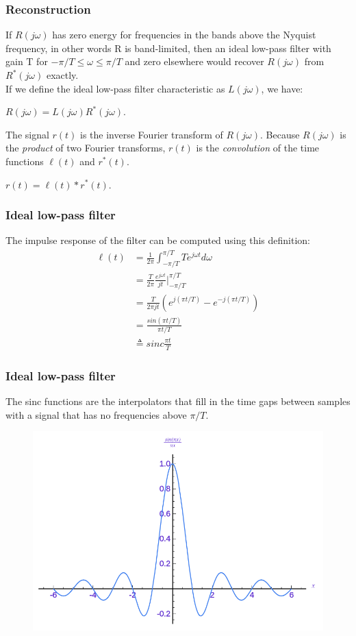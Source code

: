 \begin{frame}
	\frametitle{Reconstruction}
	If $R(j\omega)$ has zero energy for frequencies in the bands above the Nyquist frequency, in other words R is band-limited, then an ideal low-pass filter with gain T for $-\pi/T \leq \omega \leq \pi/T$ and zero elsewhere would recover $R(j\omega)$ from $R^*(j\omega)$ exactly.\\
	\medskip
	If we define the ideal low-pass filter characteristic as $L(j\omega)$, we have:
	\begin{center}
		$R(j\omega)=L(j\omega)R^*(j\omega)$.
	\end{center}
	The signal $r(t)$ is the inverse Fourier transform of $R(j\omega)$. Because $R(j\omega)$ is the \textit{product} of two Fourier transforms, $r(t)$ is the \textit{convolution} of the time functions $\ell(t)$ and $r^*(t)$.\\
	\begin{center}
		$r(t) = \ell(t) * r^*(t)$.
	\end{center}
\end{frame}

\begin{frame}
	\frametitle{Ideal low-pass filter}
	The impulse response of the filter can be computed using this definition:\\
	\vspace{-1em}
	\begin{equation}
	\begin{split}
	\ell(t) & = \frac{1}{2\pi} \int_{-\pi/T}^{\pi/T}Te^{j\omega t}d\omega\\
	& = \frac{T}{2\pi} \frac{e^{j\omega t}}{jt} \Big|_{-\pi/T}^{\pi/T}\\
	& = \frac{T}{2\pi jt}(e^{j(\pi t/T)}-e^{-j(\pi t/T)})\\
	& = \frac{sin(\pi t/T)}{\pi t/T}\\
	& \triangleq sinc\frac{\pi t}{T} \nonumber
	\end{split}
	\end{equation}
\end{frame}

\begin{frame}
	\frametitle{Ideal low-pass filter}
	The sinc functions are the interpolators that fill in the time gaps between samples with a signal that has no frequencies above $\pi/T$.
	\begin{figure}
		\centering
		\includegraphics[width=0.7\linewidth]{sinc}
	\end{figure}
\end{frame}

